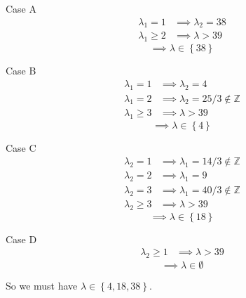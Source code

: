 \documentclass[a4paper, 11pt]{article}
\newcommand{\ZZ}{\mathbb{Z}}
\def\set#1{\left\{ #1 \right\}}
\begin{document}
\begin{mdframed}
	\centering
	\begin{minipage}{0.4\textwidth}
		\centering
		Case A
		\begin{align*}
			\lambda_1=1    &\implies \lambda_2=38\\
			\lambda_1\geq 2&\implies \lambda>39
		\end{align*}
		\[\implies \lambda\in\set{38}\]
	\end{minipage}\hfill
	\begin{minipage}{0.4\textwidth}
		\centering
		Case B
		\begin{align*}
			\lambda_1=1    &\implies \lambda_2=4\\
			\lambda_1=2    &\implies \lambda_2=25/3\notin\ZZ\\
			\lambda_1\geq3 &\implies \lambda>39
		\end{align*}
		\[\implies \lambda\in\set{4}\]
	\end{minipage}
	
	\vspace{2em}
	
	\begin{minipage}{0.4\textwidth}
		\centering
		Case C
		\begin{align*}
			\lambda_2=1    &\implies \lambda_1=14/3\notin\ZZ\\
			\lambda_2=2    &\implies \lambda_1=9\\
			\lambda_2=3    &\implies \lambda_1=40/3\notin\ZZ\\
			\lambda_2\geq 3&\implies \lambda>39
		\end{align*}
		\[\implies \lambda\in\set{18}\]
	\end{minipage}\hfill
	\begin{minipage}{0.4\textwidth}
		\centering
		Case D
		\begin{align*}
			\lambda_2\geq1 &\implies \lambda>39
		\end{align*}
		\[\implies \lambda\in\emptyset\]
	\end{minipage}
\end{mdframed}

So we must have $\lambda\in\set{4,18,38}$.

\end{document}
